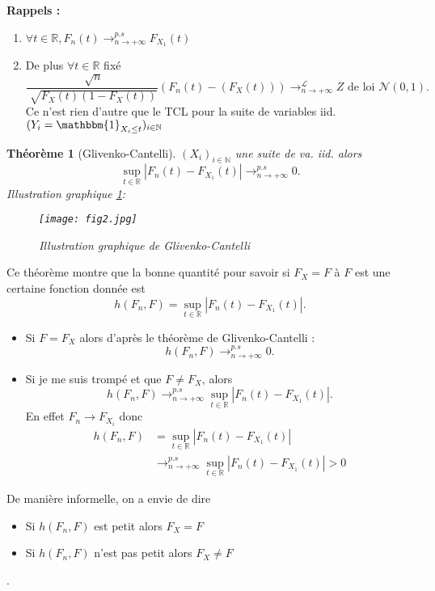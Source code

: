 \documentclass{article}
\theoremstyle{plain}%
\newtheorem{thm}{Théorème}[section]
\theoremstyle{definition}
\theoremstyle{remark}
\begin{document}
\textbf{Rappels : }
\begin{enumerate}
    \item $ \forall t \in \mathbb{R}, F_n(t) \to ^{p.s}_{n \to +\infty } F_{X_1}(t) $ 
    \item De plus $ \forall t \in \mathbb{R} $ fixé 
    \[
        \frac{\sqrt[]{n}}{\sqrt[]{F_X(t) (1 - F_X(t))}} (F_n(t) - (F_X(t))) \to ^\mathcal{L}_{n \to +\infty } Z \text{ de loi } \mathcal{N}(0,1)
        .\]
    Ce n'est rien d'autre que le TCL pour la suite de variables iid. $ (Y_i = \mathbbm{1}_{X_i \leq t})_{i \in \mathbb{N}} $ 
\end{enumerate}

\begin{thm}[Glivenko-Cantelli]
    $ (X_i)_{i \in \mathbb{N}} $ une suite de va. iid. alors 
    \[
        \sup_{t \in \mathbb{R}} \left| F_n(t) - F_{X_1}(t) \right| \to^{p.s}_{n \to + \infty } 0
    .\]
    Illustration graphique \ref{fig2}: 
    \begin{figure}[htbp]
        \centering
        \texttt{[image: fig2.jpg]}
        \caption{Illustration graphique de Glivenko-Cantelli}
        \label{fig2}
    \end{figure}
\end{thm}

Ce théorème montre que la bonne quantité pour savoir si $ F_X = F $ à $ F $ est une certaine fonction donnée est
\[
    h(F_n, F) = \sup_{t \in \mathbb{R}} \left| F_n(t) - F_{X_1}(t) \right|
.\]
\begin{itemize}
    \item Si $ F=F_X $ alors d'après le théorème de Glivenko-Cantelli :
    \[
        h(F_n, F) \to^{p.s}_{n \to + \infty } 0
    .\]
    \item Si je me suis trompé et que $ F \neq F_X $, alors 
    \[
        h(F_n, F) \to^{p.s}_{n \to + \infty } \sup_{t \in \mathbb{R}} \left| F_n(t) - F_{X_1}(t) \right|
    .\]
    En effet $ F_n \to F_{X_i} $ donc \begin{align*}
        h(F_n, F) &= \sup_{t \in \mathbb{R}} \left| F_n(t) - F_{X_1}(t) \right| \\
                    & \to^{p.s}_{n \to + \infty } \sup_{t \in \mathbb{R}} \left| F_n(t) - F_{X_1}(t) \right| > 0
    \end{align*}
\end{itemize}
De manière informelle, on a envie de dire \begin{itemize}
    \item Si $ h(F_n, F) $ est petit alors $ F_X = F $ 
    \item Si $ h(F_n, F) $ n'est pas petit alors $ F_X \neq F $ 
\end{itemize}. \\
\end{document}
